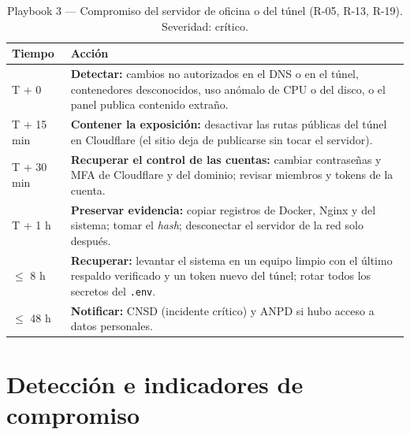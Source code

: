\begin{table}[htbp]
\centering
\caption{Playbook 3 --- Compromiso del servidor de oficina o del túnel (R-05, R-13, R-19). Severidad: crítico.}
\label{tab:anx-inc-pb3}
\small
\begin{tabularx}{\textwidth}{L{1.6cm}X}
\toprule
\textbf{Tiempo} & \textbf{Acción} \\
\midrule
T + 0 & \textbf{Detectar:} cambios no autorizados en el DNS o en el túnel, contenedores desconocidos, uso anómalo de CPU o del disco, o el panel publica contenido extraño. \\
T + 15 min & \textbf{Contener la exposición:} desactivar las rutas públicas del túnel en Cloudflare (el sitio deja de publicarse sin tocar el servidor). \\
T + 30 min & \textbf{Recuperar el control de las cuentas:} cambiar contraseñas y MFA de Cloudflare y del dominio; revisar miembros y tokens de la cuenta. \\
T + 1 h & \textbf{Preservar evidencia:} copiar registros de Docker, Nginx y del sistema; tomar el \emph{hash}; desconectar el servidor de la red solo después. \\
$\leq$ 8 h & \textbf{Recuperar:} levantar el sistema en un equipo limpio con el último respaldo verificado y un token nuevo del túnel; rotar todos los secretos del \texttt{.env}. \\
$\leq$ 48 h & \textbf{Notificar:} CNSD (incidente crítico) y ANPD si hubo acceso a datos personales. \\
\bottomrule
\end{tabularx}
\end{table}

\section{Detección e indicadores de compromiso}

